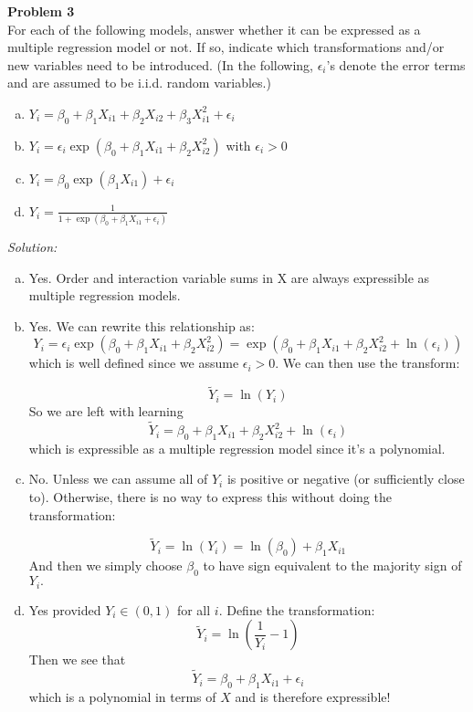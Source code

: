 \documentclass{article}
\newenvironment{problem}[2][Problem]
    { \begin{mdframed}[backgroundcolor=gray!20] \textbf{#1 #2} \\}
    {  \end{mdframed}}
\newenvironment{solution}
    {\textit{Solution:}}
    {}
\begin{document}
\begin{problem}{3}
For each of the following models, answer whether it can be expressed as a multiple regression model or not. If so, indicate which transformations and/or new variables need to be introduced. (In the following, $\epsilon_i$'s denote the error terms and are assumed to be i.i.d. random variables.)
\begin{enumerate}[(a)]
\item $Y_i = \beta_0 + \beta_1 X_{i1} + \beta_2 X_{i2} + \beta_3 X_{i1}^2 + \epsilon_i$
\item $Y_i = \epsilon_i \exp ( \beta_0 + \beta_1 X_{i1} +\beta_2 X_{i2}^2)$ with $\epsilon_i > 0$
\item $Y_i = \beta_0 \exp(\beta_1 X_{i1}) + \epsilon_i$
\item $Y_i = \frac{1}{1 + \exp(\beta_0 + \beta_1 X_{i1}  + \epsilon_i)}$
\end{enumerate}
\end{problem}
\begin{solution}
\begin{enumerate}[(a)]
\item Yes. Order and interaction variable sums in X are always expressible as multiple regression models. 
\item Yes. We can rewrite this relationship as: 
$$Y_i =  \epsilon_i \exp ( \beta_0 + \beta_1 X_{i1} +\beta_2 X_{i2}^2) = \exp ( \beta_0 + \beta_1 X_{i1} +\beta_2 X_{i2}^2 + \ln(\epsilon_i) )$$
which is well defined since we assume $\epsilon_i > 0. $ We can then use the transform: 

$$\tilde Y_i = \ln(Y_i)$$
So we are left with learning
 $$\tilde Y_i =  \beta_0 + \beta_1 X_{i1} +\beta_2 X_{i2}^2 + \ln(\epsilon_i)$$
 which is expressible as a multiple regression model since it's a polynomial. 
\item No. Unless we can assume all of $Y_i$ is positive or negative (or sufficiently close to). Otherwise, there is no way to express this without doing the transformation: 

$$\tilde Y_i = \ln(Y_i) = \ln(\beta_0) + \beta_1 X_{i1}$$
And then we simply choose $\beta_0$ to have sign equivalent to the majority sign of $Y_i.$
\item Yes provided $Y_i \in (0,1)$ for all $i$. Define the transformation: 
$$\tilde Y_i = \ln \left ( \frac{1}{Y_i} - 1 \right)$$
Then we see that
$$\tilde Y_i = \beta_0 + \beta_1 X_{i1}  + \epsilon_i$$
which is a polynomial in terms of $X$ and is therefore expressible! 
\end{enumerate}
\end{solution}
\end{document}
